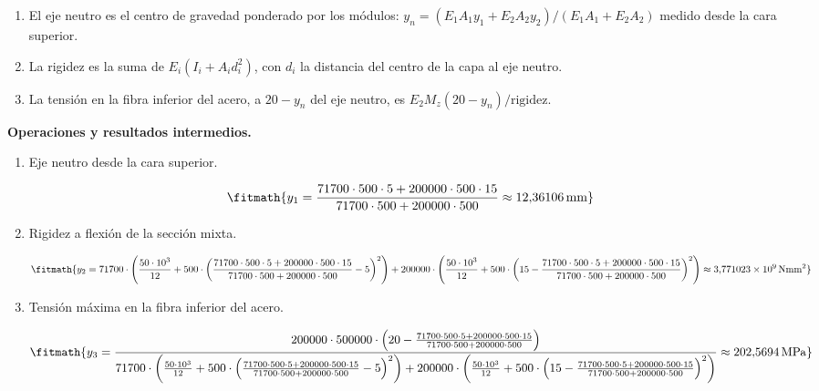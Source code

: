 \begin{enumerate}

\item El eje neutro es el centro de gravedad ponderado por los módulos: $y_n = (E_1 A_1 y_1 + E_2 A_2 y_2)/(E_1 A_1 + E_2 A_2)$ medido desde la cara superior.

\item La rigidez es la suma de $E_i (I_i + A_i d_i^2)$, con $d_i$ la distancia del centro de la capa al eje neutro.

\item La tensión en la fibra inferior del acero, a $20 - y_n$ del eje neutro, es $E_2 M_z (20 - y_n)/\text{rigidez}$.

\end{enumerate}

\noindent\textbf{Operaciones y resultados intermedios.}

\begin{enumerate}

\item Eje neutro desde la cara superior.

\[\fitmath{y_{1}=\frac{71700\cdot 500\cdot 5+200000\cdot 500\cdot 15}{71700\cdot 500+200000\cdot 500}\approx 12{,}36106\,\mathrm{mm}}\]

\item Rigidez a flexión de la sección mixta.

\[\fitmath{y_{2}=71700\cdot \left(\frac{50\cdot {10}^{3}}{12}+500\cdot {\left(\frac{71700\cdot 500\cdot 5+200000\cdot 500\cdot 15}{71700\cdot 500+200000\cdot 500}-5\right)}^{2}\right)+200000\cdot \left(\frac{50\cdot {10}^{3}}{12}+500\cdot {\left(15-\frac{71700\cdot 500\cdot 5+200000\cdot 500\cdot 15}{71700\cdot 500+200000\cdot 500}\right)}^{2}\right)\approx 3{,}771023\times10^{9}\,\mathrm{N mm^{2}}}\]

\item Tensión máxima en la fibra inferior del acero.

\[\fitmath{y_{3}=\frac{200000\cdot 500000\cdot \left(20-\frac{71700\cdot 500\cdot 5+200000\cdot 500\cdot 15}{71700\cdot 500+200000\cdot 500}\right)}{71700\cdot \left(\frac{50\cdot {10}^{3}}{12}+500\cdot {\left(\frac{71700\cdot 500\cdot 5+200000\cdot 500\cdot 15}{71700\cdot 500+200000\cdot 500}-5\right)}^{2}\right)+200000\cdot \left(\frac{50\cdot {10}^{3}}{12}+500\cdot {\left(15-\frac{71700\cdot 500\cdot 5+200000\cdot 500\cdot 15}{71700\cdot 500+200000\cdot 500}\right)}^{2}\right)}\approx 202{,}5694\,\mathrm{MPa}}\]

\end{enumerate}
